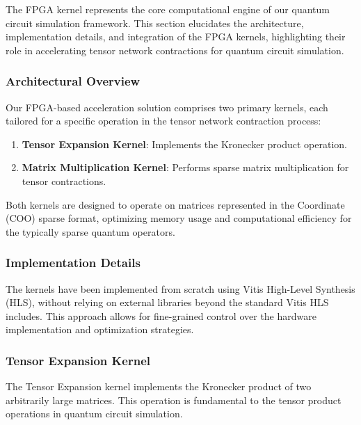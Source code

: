 \documentclass[12pt,oneside,a4paper]{article}
\begin{document}
The FPGA kernel represents the core computational engine of our quantum circuit simulation framework. This section elucidates the architecture, implementation details, and integration of the FPGA kernels, highlighting their role in accelerating tensor network contractions for quantum circuit simulation.

\subsubsection{Architectural Overview}

Our FPGA-based acceleration solution comprises two primary kernels, each tailored for a specific operation in the tensor network contraction process:

\begin{enumerate}
    \item \textbf{Tensor Expansion Kernel}: Implements the Kronecker product operation.
    \item \textbf{Matrix Multiplication Kernel}: Performs sparse matrix multiplication for tensor contractions.
\end{enumerate}

Both kernels are designed to operate on matrices represented in the Coordinate (COO) sparse format, optimizing memory usage and computational efficiency for the typically sparse quantum operators.

\subsubsection{Implementation Details}

The kernels have been implemented from scratch using Vitis High-Level Synthesis (HLS), without relying on external libraries beyond the standard Vitis HLS includes. This approach allows for fine-grained control over the hardware implementation and optimization strategies.

\subsubsection{Tensor Expansion Kernel}

The Tensor Expansion kernel implements the Kronecker product of two arbitrarily large matrices. This operation is fundamental to the tensor product operations in quantum circuit simulation.
\end{document}
